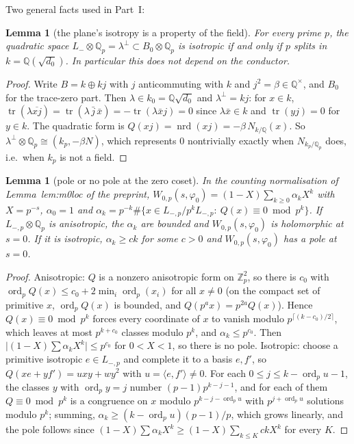 \documentclass[11pt,reqno]{amsart}
\theoremstyle{plain}
\newtheorem{lemma}[theorem]{Lemma}
\theoremstyle{definition}
\DeclareMathOperator{\ord}{ord}
\DeclareMathOperator{\tr}{tr}
\DeclareMathOperator{\nrd}{nrd}
\newcommand{\Q}{\mathbb{Q}}
\newcommand{\Z}{\mathbb{Z}}
\newcommand{\Lm}{L_{-}}
\begin{document}
Two general facts used in Part~I:

\begin{lemma}[the plane's isotropy is a property of the field]\label{lem:split}
For every prime $p$, the quadratic space $\Lm\otimes\Q_p=\lambda^\perp\subset B_0\otimes\Q_p$ is
isotropic if and only if $p$ splits in $k=\Q(\sqrt{d_0})$. In particular this does not depend on
the conductor.
\end{lemma}
\begin{proof}
Write $B=k\oplus kj$ with $j$ anticommuting with $k$ and $j^2=\beta\in\Q^\times$, and $B_0$ for the
trace-zero part. Then $\lambda\in k_0=\Q\sqrt{d_0}$ and $\lambda^\perp=kj$: for $x\in k$,
$\tr(\lambda\overline{xj})=\tr(\lambda\,\bar j\,\bar x)=-\tr(\lambda\bar x j)=0$ since $\lambda\bar x
\in k$ and $\tr(yj)=0$ for $y\in k$. The quadratic form is $Q(xj)=\nrd(xj)=-\beta\,N_{k/\Q}(x)$.
So $\lambda^\perp\otimes\Q_p\cong(k_p,-\beta N)$, which represents $0$ nontrivially exactly when
$N_{k_p/\Q_p}$ does, i.e.\ when $k_p$ is not a field.
\end{proof}

\begin{lemma}[pole or no pole at the zero coset]\label{lem:pole}
In the counting normalisation of \textup{Lemma~lem:m0loc of the preprint}, $W_{0,p}(s,\varphi_0)=
(1-X)\sum_{k\ge0}\alpha_kX^k$ with $X=p^{-s}$, $\alpha_0=1$ and $\alpha_k=p^{-k}\#\{x\in
L_{-,p}/p^kL_{-,p}:\ Q(x)\equiv0\bmod p^k\}$. If $L_{-,p}\otimes\Q_p$ is anisotropic, the $\alpha_k$
are bounded and $W_{0,p}(s,\varphi_0)$ is holomorphic at $s=0$. If it is isotropic, $\alpha_k\ge
ck$ for some $c>0$ and $W_{0,p}(s,\varphi_0)$ has a pole at $s=0$.
\end{lemma}
\begin{proof}
Anisotropic: $Q$ is a nonzero anisotropic form on $\Z_p^2$, so there is $c_0$ with
$\ord_p Q(x)\le c_0+2\min_i\ord_p(x_i)$ for all $x\ne0$ (on the compact set of primitive $x$,
$\ord_pQ(x)$ is bounded, and $Q(p^ax)=p^{2a}Q(x)$). Hence $Q(x)\equiv0\bmod p^k$ forces every
coordinate of $x$ to vanish modulo $p^{\lceil(k-c_0)/2\rceil}$, which leaves at most $p^{k+c_0}$
classes modulo $p^k$, and $\alpha_k\le p^{c_0}$. Then $\lvert(1-X)\sum\alpha_kX^k\rvert\le p^{c_0}$
for $0<X<1$, so there is no pole. Isotropic: choose a primitive isotropic $e\in L_{-,p}$ and
complete it to a basis $e,f'$, so $Q(xe+yf')=uxy+wy^2$ with $u=\langle e,f'\rangle\ne0$. For each
$0\le j\le k-\ord_pu-1$, the classes $y$ with $\ord_py=j$ number $(p-1)p^{k-j-1}$, and for each of
them $Q\equiv0\bmod p^k$ is a congruence on $x$ modulo $p^{k-j-\ord_pu}$ with $p^{j+\ord_pu}$
solutions modulo $p^k$; summing, $\alpha_k\ge(k-\ord_pu)(p-1)/p$, which grows linearly, and the
pole follows since $(1-X)\sum\alpha_kX^k\ge(1-X)\sum_{k\le K}ckX^k$ for every $K$.
\end{proof}
\end{document}
